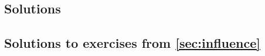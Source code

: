 \begin{pdfonly}
\begin{solutionsonly}
\clearpage
\appendix
\section{Solutions}\label{app:solutions}
\end{solutionsonly}
\end{pdfonly}



\begin{pdfonly}\begin{solutionsonly}
\subsection{Solutions to exercises from \cref{sec:influence}}
\end{solutionsonly}\end{pdfonly}

